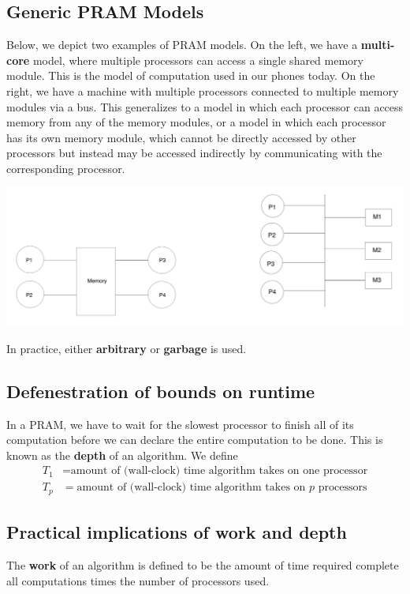 \documentclass[11pt]{article}
\begin{document}
\subsection{Generic PRAM Models}
\label{sec:org9c45151}
Below, we depict two examples of PRAM models. On the left, we have a \textbf{multi-core} model, where
multiple processors can access a single shared memory module. This is the model of computation
used in our phones today. On the right, we have a machine with multiple processors connected to
multiple memory modules via a bus. This generalizes to a model in which each processor can
access memory from any of the memory modules, or a model in which each processor has its own
memory module, which cannot be directly accessed by other processors but instead may be accessed
indirectly by communicating with the corresponding processor.
\begin{center}
\includegraphics[width=.8\textwidth]{../images/cme323/1.png}
\label{Examples of PRAM}
\end{center}

In practice, either \textbf{arbitrary} or \textbf{garbage} is used.
\subsection{Defenestration of bounds on runtime}
\label{sec:org0f02bd7}
In a PRAM, we have to wait for the slowest processor to finish all of its computation before we
can declare the entire computation to be done. This is known as the \textbf{depth} of an algorithm. We
define
 \begin{align*}
T_1&=\text{amount of (wall-clock) time algorithm takes on one processor}\\
T_p&=\text{amount of (wall-clock) time algorithm takes on \(p\) processors}
 \end{align*}
\subsection{Practical implications of work and depth}
\label{sec:orgff0e276}
\begin{definition}[Work]
The \textbf{work} of an algorithm is defined to be the amount of time required complete all computations
times the number of processors used.
\end{definition}
\end{document}

